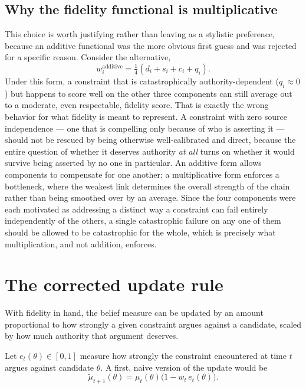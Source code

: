 \subsection*{Why the fidelity functional is multiplicative}

This choice is worth justifying rather than leaving as a stylistic preference, because an additive functional was the more obvious first guess and was rejected for a specific reason. Consider the alternative,
\[
w_i^{\text{additive}} = \tfrac{1}{4}(d_i + s_i + c_i + q_i).
\]
Under this form, a constraint that is catastrophically authority-dependent ($q_i \approx 0$) but happens to score well on the other three components can still average out to a moderate, even respectable, fidelity score. That is exactly the wrong behavior for what fidelity is meant to represent. A constraint with zero source independence --- one that is compelling only because of who is asserting it --- should not be rescued by being otherwise well-calibrated and direct, because the entire question of whether it deserves authority \emph{at all} turns on whether it would survive being asserted by no one in particular. An additive form allows components to compensate for one another; a multiplicative form enforces a bottleneck, where the weakest link determines the overall strength of the chain rather than being smoothed over by an average. Since the four components were each motivated as addressing a distinct way a constraint can fail entirely independently of the others, a single catastrophic failure on any one of them should be allowed to be catastrophic for the whole, which is precisely what multiplication, and not addition, enforces.

\section{The corrected update rule}

With fidelity in hand, the belief measure can be updated by an amount proportional to how strongly a given constraint argues against a candidate, scaled by how much authority that argument deserves.

\begin{definition}
Let $e_t(\theta) \in [0,1]$ measure how strongly the constraint encountered at time $t$ argues against candidate $\theta$. A first, naive version of the update would be
\[
\tilde\mu_{t+1}(\theta) = \mu_t(\theta)\bigl(1 - w_t\, e_t(\theta)\bigr).
\]
\end{definition}

